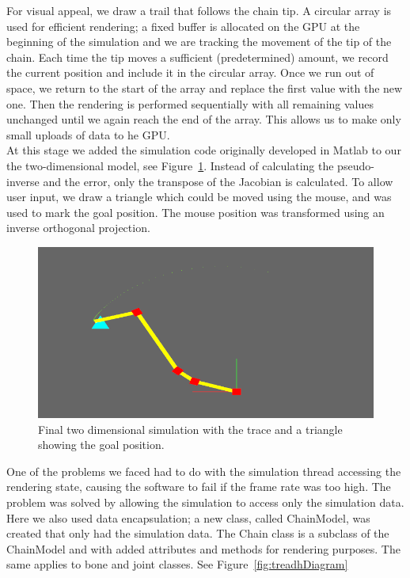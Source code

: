 \documentclass[paper=a4, fontsize=11pt]{scrartcl} %
\numberwithin{equation}{section} %
\numberwithin{figure}{section} %
\numberwithin{table}{section} %
\begin{document}
For visual appeal, we draw a trail that follows the chain tip. A circular array is used for efficient rendering; a fixed buffer is allocated on the GPU at the beginning of the simulation and we are tracking the movement of the tip of the chain. Each time the tip moves a sufficient (predetermined) amount, we record the current position and include it in the circular array. Once we run out of space, we return to the start of the array and replace the first value with the new one. Then the rendering is performed sequentially with all remaining values unchanged until we again reach the end of the array. This allows us to make only small uploads of data to he GPU. \\

At this stage we added the simulation code originally developed in Matlab to our the two-dimensional model, see Figure~\ref{fig:2Dpicture}. Instead of calculating the pseudo-inverse and the error, only the transpose of the Jacobian is calculated. To allow user input, we draw a triangle which could be moved using the mouse, and was used to mark the goal position. The mouse position was transformed using an inverse orthogonal projection. \\

\begin{figure}[h]
\centering
\includegraphics[scale=0.4]{chain2Dv2}
\caption{Final two dimensional simulation with the trace and a triangle showing the goal position.}
\label{fig:2Dpicture}
\end{figure}

One of the problems we faced had to do with the simulation thread accessing the rendering state, causing the software to fail if the frame rate was too high. The problem was solved by allowing the simulation to access only the simulation data. Here we also used data encapsulation; a new class, called ChainModel, was created that only had the simulation data. The Chain class is a subclass of the ChainModel and with added attributes and methods for rendering purposes. The same applies to bone and joint classes. See Figure~\ref{fig:treadhDiagram}  \\
\end{document}
